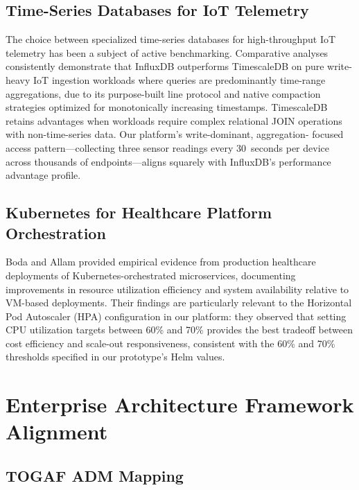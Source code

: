 \documentclass[conference]{IEEEtran}
\begin{document}
\subsection{Time-Series Databases for IoT Telemetry}

The choice between specialized time-series databases for high-throughput IoT telemetry
has been a subject of active benchmarking. Comparative analyses \cite{b7} consistently
demonstrate that InfluxDB outperforms TimescaleDB on pure write-heavy IoT ingestion
workloads where queries are predominantly time-range aggregations, due to its purpose-built
line protocol and native compaction strategies optimized for monotonically increasing
timestamps. TimescaleDB retains advantages when workloads require complex relational
JOIN operations with non-time-series data. Our platform's write-dominant, aggregation-
focused access pattern---collecting three sensor readings every 30~seconds per device
across thousands of endpoints---aligns squarely with InfluxDB's performance advantage
profile.

\subsection{Kubernetes for Healthcare Platform Orchestration}

Boda and Allam \cite{b20} provided empirical evidence from production healthcare
deployments of Kubernetes-orchestrated microservices, documenting improvements in
resource utilization efficiency and system availability relative to VM-based deployments.
Their findings are particularly relevant to the Horizontal Pod Autoscaler (HPA)
configuration in our platform: they observed that setting CPU utilization targets
between 60\% and 70\% provides the best tradeoff between cost efficiency and
scale-out responsiveness, consistent with the 60\% and 70\% thresholds specified in
our prototype's Helm values.

\section{Enterprise Architecture Framework Alignment}

\subsection{TOGAF ADM Mapping}
\end{document}
